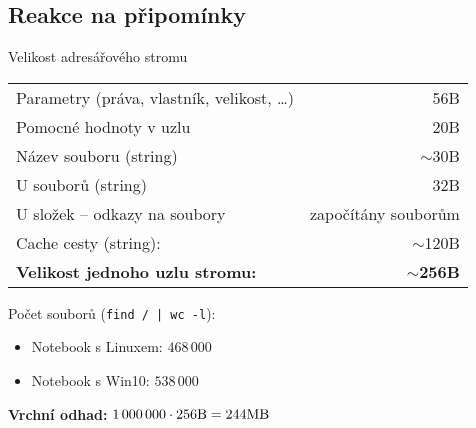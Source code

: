 \documentclass{beamer}				%
\begin{document}
\subsection{Reakce na připomínky}
\begin{frame}{Velikost adresářového stromu}
\pause
\begin{tabular}{l | r }
\hline\hline
Parametry (práva, vlastník, velikost, \dots) & 56B \\
Pomocné hodnoty v uzlu & 20B \\
Název souboru (string) & $\sim$30B \\
U souborů (string) & 32B \\
U složek -- odkazy na soubory & započítány souborům \\
Cache cesty (string): & $\sim$120B\\
\hline\hline
\bf Velikost jednoho uzlu stromu: & \bf $\sim$256B
\end{tabular}

\bigskip\pause

Počet souborů (\texttt{find / | wc -l}):
\begin{itemize}
	\item Notebook s Linuxem: $468\,000$
	\item Notebook s Win10: $538\,000$
\end{itemize}

\bigskip\pause

{\bf Vrchní odhad:} $1\,000\,000 \cdot 256\hbox{B} = 244\hbox{MB}$

\end{frame}
\end{document}
